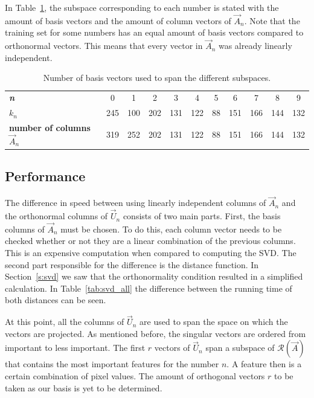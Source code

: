 In Table~\ref{tab:nr_of_basis}, the subspace corresponding to each number is stated with the amount of basis vectors and the amount of column vectors of \(\vec{A}_n\).
Note that the training set for some numbers has an equal amount of basis vectors compared to orthonormal vectors.
This means that every vector in \(\vec{A}_n\) was already linearly independent.
\begin{table}[H]
    \centering
    \caption{Number of basis vectors used to span the different subspaces.}\label{tab:nr_of_basis}
    \begin{tabular}{lcccccccccc}
        \toprule
        \textbf{\textit{n}}                                         & 0   & 1   & 2   & 3   & 4   & 5   & 6   & 7   & 8   & 9   \\
        \textbf{\(k_n\)} & 245 & 100 & 202 & 131 & 122 & 88 & 151 & 166 & 144 & 132 \\
        \textbf{number of columns \(\vec{A}_n\)}       & 319 & 252 & 202 & 131 & 122 & 88  & 151 & 166 & 144 & 132 \\
        \bottomrule
    \end{tabular}
\end{table}
\subsection{Performance}
The difference in speed between using linearly independent columns of \(\vec{A}_n\) and the orthonormal columns of \(\vec{U}_n\) consists of two main parts.
First, the basis columns of \(\vec{A}_n\) must be chosen. To do this, each column vector needs to be checked whether or not they are a linear combination of the previous columns.
This is an expensive computation when compared to computing the SVD.\@
The second part responsible for the difference is the distance function. In Section~\ref{s:svd} we saw that the orthonormality condition resulted in a simplified calculation.
In Table~\ref{tab:svd_all} the difference between the running time of both distances can be seen.

At this point, all the columns of \(\vec{U}_n\) are used to span the space on which the vectors are projected.
As mentioned before, the singular vectors are ordered from important to less important.
The first \(r\) vectors of \(\vec{U}_n\) span a subspace of \(\mathcal{R}(\vec{A})\) that contains the most important features for the number \(n\).
A feature then is a certain combination of pixel values.
The amount of orthogonal vectors \(r\) to be taken as our basis is yet to be determined.

